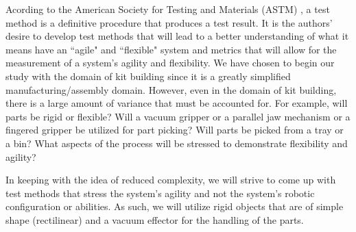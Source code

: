 Acording to the American Society for Testing and Materials (ASTM) \cite[p. vii]{ASTM99}, a test method is a
definitive procedure that produces a test result. It is the authors' desire to develop test methods that will
lead to a better understanding of what it means have an ``agile" and ``flexible" system and metrics that 
will allow for the measurement of a system's agility and flexibility. We have chosen to begin our study
with the domain of kit building since it is a greatly simplified manufacturing/assembly domain. However, 
even in the domain of kit building, there is a large amount of variance that must be accounted for. For
example, will parts be rigid or flexible? Will a vacuum gripper or a parallel jaw mechanism or a fingered 
gripper be utilized for part picking? Will parts be picked from a tray or a bin? What aspects of the
process will be stressed to demonstrate flexibility and agility?

In keeping with the idea of reduced complexity, we will strive to come up with test methods that stress
the system's agility and not the system's robotic configuration or abilities. As such, we will utilize
rigid objects that are of simple shape (rectilinear) and a vacuum effector for the handling of the parts.